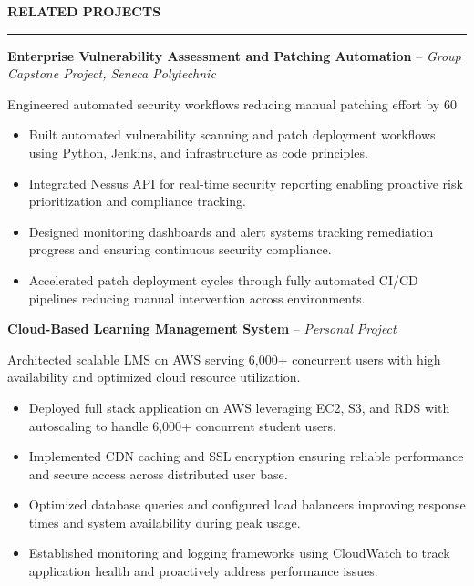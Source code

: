 \documentclass[10pt,letterpaper]{article}
\begin{document}
\vspace{6pt}

\textbf{RELATED PROJECTS}\\[-8pt]
\noindent\rule{\textwidth}{1pt}

\vspace{-2pt}

\textbf{Enterprise Vulnerability Assessment and Patching Automation} -- \emph{Group Capstone Project, Seneca Polytechnic }

\vspace{-1pt}

Engineered automated security workflows reducing manual patching effort by 60%
\vspace{-1pt}
\begin{itemize}
\item Built automated vulnerability scanning and patch deployment workflows using Python, Jenkins, and infrastructure as code principles.
\item Integrated Nessus API for real-time security reporting enabling proactive risk prioritization and compliance tracking.
\item Designed monitoring dashboards and alert systems tracking remediation progress and ensuring continuous security compliance.
\item Accelerated patch deployment cycles through fully automated CI/CD pipelines reducing manual intervention across environments.
\end{itemize}

\textbf{Cloud-Based Learning Management System} -- \emph{Personal Project}

\vspace{-1pt}

Architected scalable LMS on AWS serving 6,000+ concurrent users with high availability and optimized cloud resource utilization.
\vspace{-1pt}
\begin{itemize}
\item Deployed full stack application on AWS leveraging EC2, S3, and RDS with autoscaling to handle 6,000+ concurrent student users.
\item Implemented CDN caching and SSL encryption ensuring reliable performance and secure access across distributed user base.
\item Optimized database queries and configured load balancers improving response times and system availability during peak usage.
\item Established monitoring and logging frameworks using CloudWatch to track application health and proactively address performance issues.
\end{itemize}
\end{document}
